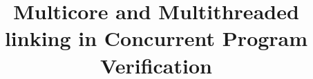 \documentclass[acmsmall]{acmart}
\begin{document}

\title{Multicore and Multithreaded linking in Concurrent Program Verification}

\maketitle











%


%
% 


\end{document}
